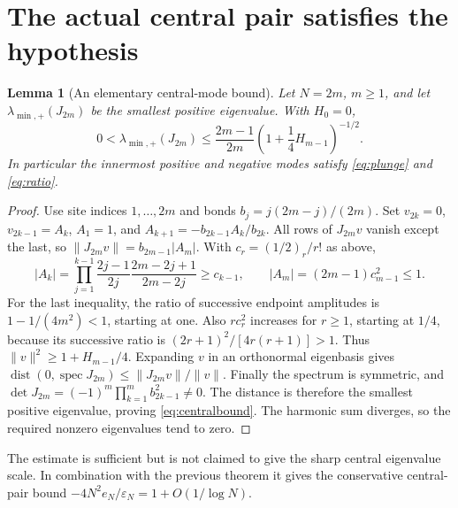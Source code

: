 \documentclass[10pt]{article}
\newtheorem{lemma}[theorem]{Lemma}
\begin{document}
\section{The actual central pair satisfies the hypothesis}
\begin{lemma}[An elementary central-mode bound]
Let $N=2m$, $m\ge1$, and let $\lambda_{\min,+}(J_{2m})$ be the
smallest positive eigenvalue. With $H_0=0$,
\begin{equation}
0<\lambda_{\min,+}(J_{2m})
\le\frac{2m-1}{2m}\left(1+\frac14H_{m-1}\right)^{-1/2}.
\label{eq:centralbound}
\end{equation}
In particular the innermost positive and negative modes satisfy
\eqref{eq:plunge} and \eqref{eq:ratio}.
\end{lemma}
\begin{proof}
Use site indices $1,\ldots,2m$ and bonds
$b_j=j(2m-j)/(2m)$. Set $v_{2k}=0$, $v_{2k-1}=A_k$,
$A_1=1$, and $A_{k+1}=-b_{2k-1}A_k/b_{2k}$.
All rows of $J_{2m}v$ vanish except the last, so
$\|J_{2m}v\|=b_{2m-1}|A_m|$.
With $c_r=(1/2)_r/r!$ as above,
\[
|A_k|=\prod_{j=1}^{k-1}\frac{2j-1}{2j}
\frac{2m-2j+1}{2m-2j}\ge c_{k-1},\qquad
|A_m|=(2m-1)c_{m-1}^2\le1.
\]
For the last inequality, the ratio of successive endpoint amplitudes
is $1-1/(4m^2)<1$, starting at one.
Also $r c_r^2$ increases for $r\ge1$, starting at $1/4$,
because its successive ratio is $(2r+1)^2/[4r(r+1)]>1$.
Thus $\|v\|^2\ge1+H_{m-1}/4$.
Expanding $v$ in an orthonormal eigenbasis gives
$\operatorname{dist}(0,\operatorname{spec}J_{2m})
\le\|J_{2m}v\|/\|v\|$.
Finally the spectrum is symmetric, and
$\det J_{2m}=(-1)^m\prod_{k=1}^m b_{2k-1}^2\ne0$.
The distance is therefore the smallest positive eigenvalue, proving
\eqref{eq:centralbound}. The harmonic sum diverges, so the required
nonzero eigenvalues tend to zero.
\end{proof}
The estimate is sufficient but is not claimed to give the sharp
central eigenvalue scale. In combination with the previous theorem
it gives the conservative central-pair bound
$-4N^2e_N/\varepsilon_N=1+O(1/\log N)$.
\end{document}
